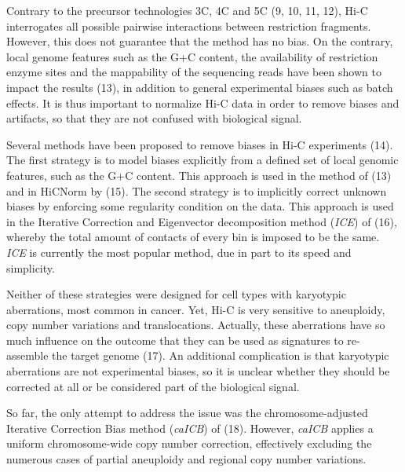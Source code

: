 \documentclass[a4,center,fleqn]{NAR}
\providecommand{\DIFadd}[1]{{\protect\color{red}#1}} %
\providecommand{\DIFaddbegin}{} %
\providecommand{\DIFaddend}{} %
\begin{document}
Contrary to the precursor technologies 3C, 4C and 5C
(9, 10, 11, 12), Hi-C interrogates all possible
pairwise interactions between restriction fragments. However, this does
not guarantee that the method has no bias.  On the contrary, local genome
features such as the G+C content, the availability of restriction enzyme
sites and the mappability of the sequencing reads have been shown to
impact the results (13), in addition to general
experimental biases such as batch effects. It is thus important to
normalize Hi-C data in order to remove biases and artifacts, so that they
are not confused with biological signal.

Several methods have been proposed to remove biases in Hi-C experiments
(14). The first strategy is to model biases
explicitly from a defined set of local genomic features, such as the G+C
content. This approach is used in the method of
(13) and in HiCNorm by (15).
The second strategy is to implicitly correct unknown biases by enforcing
some regularity condition on the data. This approach is used in the
Iterative Correction and Eigenvector decomposition method (\textit{ICE})
of (16), whereby the total amount of contacts of
every bin is imposed to be the same. \textit{ICE} is currently the most
popular method, due in part to its speed \DIFaddbegin \DIFadd{and simplicity}\DIFaddend .

Neither of these strategies were designed for cell types with karyotypic
aberrations, most common in cancer. Yet, Hi-C is very sensitive to
aneuploidy, copy number variations and translocations. Actually, these
aberrations have so much influence on the outcome that they can be used as
signatures to re-assemble the target genome (17). An
additional complication is that karyotypic aberrations are not
experimental biases, so it is unclear whether they should be corrected at
all or be considered part of the biological signal.

\enlargethispage{-65.1pt}

So far, the only attempt to address the issue was the chromosome-adjusted
Iterative Correction Bias method (\textit{caICB}) of
(18). However, \textit{caICB} applies a uniform
chromosome-wide copy number correction, effectively excluding the numerous
cases of partial aneuploidy and regional copy number variations.
\end{document}
